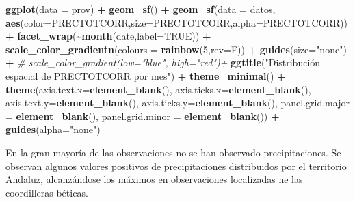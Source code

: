 \documentclass[12pt,a4paper,]{book}
\newenvironment{Shaded}{\begin{snugshade}}{\end{snugshade}}
\newcommand{\AttributeTok}[1]{\textcolor[rgb]{0.13,0.29,0.53}{#1}}
\newcommand{\CommentTok}[1]{\textcolor[rgb]{0.56,0.35,0.01}{\textit{#1}}}
\newcommand{\ConstantTok}[1]{\textcolor[rgb]{0.56,0.35,0.01}{#1}}
\newcommand{\DecValTok}[1]{\textcolor[rgb]{0.00,0.00,0.81}{#1}}
\newcommand{\FunctionTok}[1]{\textcolor[rgb]{0.13,0.29,0.53}{\textbf{#1}}}
\newcommand{\NormalTok}[1]{#1}
\newcommand{\SpecialCharTok}[1]{\textcolor[rgb]{0.81,0.36,0.00}{\textbf{#1}}}
\newcommand{\StringTok}[1]{\textcolor[rgb]{0.31,0.60,0.02}{#1}}
\numberwithin{dummy}{section}
\theoremstyle{ocrenumbox}
\theoremstyle{blacknumex}
\theoremstyle{blacknumbox}
\theoremstyle{ocrenum}
\theoremstyle{ocrenum}
\begin{document}
\begin{Shaded}
\begin{Highlighting}[]
\FunctionTok{ggplot}\NormalTok{(}\AttributeTok{data =}\NormalTok{ prov) }\SpecialCharTok{+} 
  \FunctionTok{geom\_sf}\NormalTok{() }\SpecialCharTok{+}
  \FunctionTok{geom\_sf}\NormalTok{(}\AttributeTok{data =}\NormalTok{ datos, }\FunctionTok{aes}\NormalTok{(}\AttributeTok{color=}\NormalTok{PRECTOTCORR,}\AttributeTok{size=}\NormalTok{PRECTOTCORR,}\AttributeTok{alpha=}\NormalTok{PRECTOTCORR)) }\SpecialCharTok{+}
  \FunctionTok{facet\_wrap}\NormalTok{(}\SpecialCharTok{\textasciitilde{}}\FunctionTok{month}\NormalTok{(date,}\AttributeTok{label=}\ConstantTok{TRUE}\NormalTok{)) }\SpecialCharTok{+} 
  \FunctionTok{scale\_color\_gradientn}\NormalTok{(}\AttributeTok{colours =} \FunctionTok{rainbow}\NormalTok{(}\DecValTok{5}\NormalTok{,}\AttributeTok{rev=}\NormalTok{F)) }\SpecialCharTok{+}
  \FunctionTok{guides}\NormalTok{(}\AttributeTok{size=}\StringTok{"none"}\NormalTok{) }\SpecialCharTok{+}
  \CommentTok{\# scale\_color\_gradient(low="blue", high="red")+}
  \FunctionTok{ggtitle}\NormalTok{(}\StringTok{"Distribución espacial de PRECTOTCORR por mes"}\NormalTok{) }\SpecialCharTok{+}
  \FunctionTok{theme\_minimal}\NormalTok{() }\SpecialCharTok{+}
  \FunctionTok{theme}\NormalTok{(}\AttributeTok{axis.text.x=}\FunctionTok{element\_blank}\NormalTok{(),}
        \AttributeTok{axis.ticks.x=}\FunctionTok{element\_blank}\NormalTok{(),}
        \AttributeTok{axis.text.y=}\FunctionTok{element\_blank}\NormalTok{(),}
        \AttributeTok{axis.ticks.y=}\FunctionTok{element\_blank}\NormalTok{(),}
        \AttributeTok{panel.grid.major =} \FunctionTok{element\_blank}\NormalTok{(),}
        \AttributeTok{panel.grid.minor =} \FunctionTok{element\_blank}\NormalTok{()) }\SpecialCharTok{+}
  \FunctionTok{guides}\NormalTok{(}\AttributeTok{alpha=}\StringTok{"none"}\NormalTok{)}
\end{Highlighting}
\end{Shaded}

En la gran mayoría de las observaciones no se han observado
precipitaciones. Se observan algunos valores positivos de
precipitaciones distribuidos por el territorio Andaluz, alcanzándose los
máximos en observaciones localizadas ne las coordilleras béticas.
\end{document}
